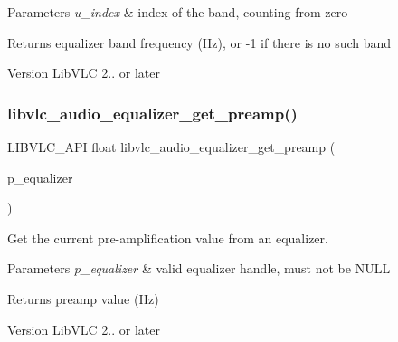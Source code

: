 \begin{DoxyParams}{Parameters}
{\em u\+\_\+index} & index of the band, counting from zero \\
\hline
\end{DoxyParams}
\begin{DoxyReturn}{Returns}
equalizer band frequency (Hz), or -\/1 if there is no such band 
\end{DoxyReturn}
\begin{DoxyVersion}{Version}
Lib\+V\+LC 2.. or later 
\end{DoxyVersion}
\mbox{\label{group__libvlc__audio_ga4ed1997fdc55963df5c7ae26c3ffa735}} 
\subsubsection{\texorpdfstring{libvlc\+\_\+audio\+\_\+equalizer\+\_\+get\+\_\+preamp()}{libvlc\_audio\_equalizer\_get\_preamp()}}
{\footnotesize\ttfamily L\+I\+B\+V\+L\+C\+\_\+\+A\+PI float libvlc\+\_\+audio\+\_\+equalizer\+\_\+get\+\_\+preamp (\begin{DoxyParamCaption}\item[{\hyperlink{group__libvlc__media__player_ga1ea141a84d68d0147fc58d99bfc83ab7}{libvlc\+\_\+equalizer\+\_\+t} $\ast$}]{p\+\_\+equalizer }\end{DoxyParamCaption})}

Get the current pre-\/amplification value from an equalizer.


\begin{DoxyParams}{Parameters}
{\em p\+\_\+equalizer} & valid equalizer handle, must not be N\+U\+LL \\
\hline
\end{DoxyParams}
\begin{DoxyReturn}{Returns}
preamp value (Hz) 
\end{DoxyReturn}
\begin{DoxyVersion}{Version}
Lib\+V\+LC 2.. or later 
\end{DoxyVersion}
\mbox{\label{group__libvlc__audio_gad75abcc5fbdc2d620808df6516a8e7fe}} 
